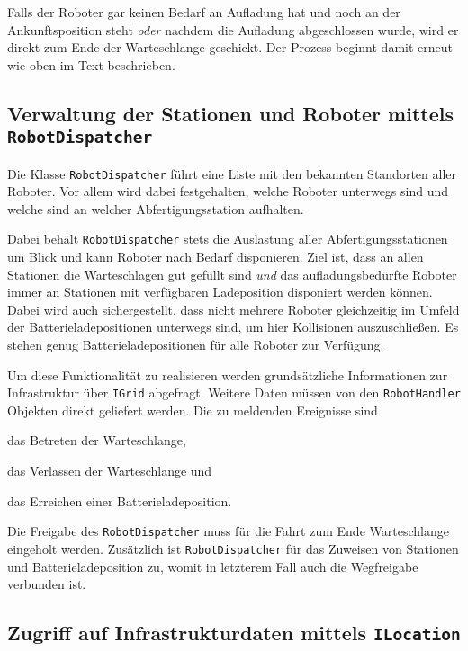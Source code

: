 Falls der Roboter gar keinen Bedarf an Aufladung hat und noch an der Ankunftsposition steht \emph{oder} nachdem die Aufladung abgeschlossen wurde, wird er direkt zum Ende der Warteschlange geschickt. 
Der Prozess beginnt damit erneut wie oben im Text beschrieben.



\subsection{Verwaltung der Stationen und Roboter mittels \texttt{RobotDispatcher}}
\label{subsec:robot_dispatch}

Die Klasse \texttt{RobotDispatcher} führt eine Liste mit den bekannten Standorten aller Roboter. Vor allem wird dabei festgehalten, welche Roboter unterwegs sind und welche sind an welcher Abfertigungsstation aufhalten.

Dabei behält \texttt{RobotDispatcher} stets die Auslastung aller Abfertigungsstationen um Blick und kann Roboter nach Bedarf disponieren. Ziel ist, dass an allen Stationen die Warteschlagen gut gefüllt sind \emph{und} das aufladungsbedürfte Roboter immer an Stationen mit verfügbaren Ladeposition disponiert werden können.
Dabei wird auch sichergestellt, dass nicht mehrere Roboter gleichzeitig im Umfeld der Batterieladepositionen unterwegs sind, um hier Kollisionen auszuschließen.
Es stehen genug Batterieladepositionen für alle Roboter zur Verfügung.

Um diese Funktionalität zu realisieren werden grundsätzliche Informationen zur Infrastruktur über \texttt{IGrid} abgefragt. Weitere Daten müssen von den \texttt{RobotHandler} Objekten direkt geliefert werden.
Die zu meldenden Ereignisse sind 
\begin{enumerate*}
	\item das Betreten der Warteschlange,
	\item das Verlassen der Warteschlange und
	\item das Erreichen einer Batterieladeposition.
\end{enumerate*}
Die Freigabe des \texttt{RobotDispatcher} muss für die Fahrt zum Ende Warteschlange eingeholt werden.
Zusätzlich ist \texttt{RobotDispatcher} für das Zuweisen von Stationen und Batterieladeposition zu, womit in letzterem Fall auch die Wegfreigabe verbunden ist.



\subsection{Zugriff auf Infrastrukturdaten mittels \texttt{ILocation}}

